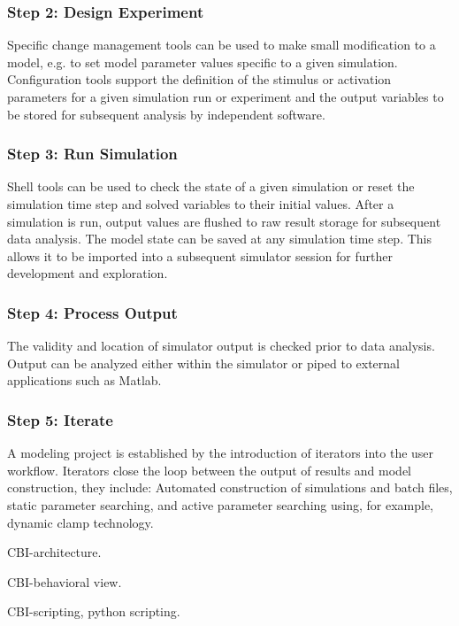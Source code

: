 \documentclass[12pt]{article}
\begin{document}
\subsubsection*{Step 2: Design Experiment}

Specific change management tools can be used to make small
modification to a model, e.g. to set model parameter values specific
to a given simulation.  Configuration tools support the definition of
the stimulus or activation parameters for a given simulation run or
experiment and the output variables to be stored for subsequent
analysis by independent software.

\subsubsection*{Step 3: Run Simulation}

Shell tools can be used to check the state of a given simulation or reset the simulation time step and solved variables to their initial values. After a simulation is run, output values are flushed to raw result storage for subsequent data analysis. The model state can be saved at any simulation time step. This allows it to be imported into a subsequent simulator session for further development and exploration.

\subsubsection*{Step 4: Process Output}

The validity and location of simulator output is checked prior to data
analysis. Output can be analyzed either within the simulator or piped
to external applications such as
Matlab. %

\subsubsection*{Step 5: Iterate}

A modeling project is established by the introduction of iterators
into the user workflow. Iterators close the loop between the output of
results and model construction, they include: Automated construction
of simulations and batch files, static parameter searching, and active
parameter searching using, for example, dynamic clamp technology.


CBI-architecture.

CBI-behavioral view.

CBI-scripting, python scripting.
\end{document}
